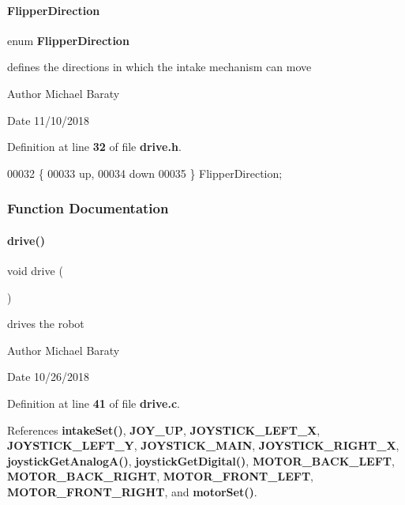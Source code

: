 \paragraph{Flipper\+Direction}
{\footnotesize\ttfamily enum \textbf{ Flipper\+Direction}}



defines the directions in which the intake mechanism can move 

\begin{DoxyAuthor}{Author}
Michael Baraty 
\end{DoxyAuthor}
\begin{DoxyDate}{Date}
11/10/2018 
\end{DoxyDate}


Definition at line \textbf{ 32} of file \textbf{ drive.\+h}.


\begin{DoxyCode}
00032              \{
00033   up,
00034   down
00035 \} FlipperDirection;
\end{DoxyCode}


\subsubsection{Function Documentation}
\mbox{\label{drive_8h_a928e32686c7e00c1ecde24c3da3019f7}} 
\paragraph{drive()}
{\footnotesize\ttfamily void drive (\begin{DoxyParamCaption}{ }\end{DoxyParamCaption})}



drives the robot 

\begin{DoxyAuthor}{Author}
Michael Baraty 
\end{DoxyAuthor}
\begin{DoxyDate}{Date}
10/26/2018 
\end{DoxyDate}


Definition at line \textbf{ 41} of file \textbf{ drive.\+c}.



References \textbf{ intake\+Set()}, \textbf{ J\+O\+Y\+\_\+\+UP}, \textbf{ J\+O\+Y\+S\+T\+I\+C\+K\+\_\+\+L\+E\+F\+T\+\_\+X}, \textbf{ J\+O\+Y\+S\+T\+I\+C\+K\+\_\+\+L\+E\+F\+T\+\_\+Y}, \textbf{ J\+O\+Y\+S\+T\+I\+C\+K\+\_\+\+M\+A\+IN}, \textbf{ J\+O\+Y\+S\+T\+I\+C\+K\+\_\+\+R\+I\+G\+H\+T\+\_\+X}, \textbf{ joystick\+Get\+Analog\+A()}, \textbf{ joystick\+Get\+Digital()}, \textbf{ M\+O\+T\+O\+R\+\_\+\+B\+A\+C\+K\+\_\+\+L\+E\+FT}, \textbf{ M\+O\+T\+O\+R\+\_\+\+B\+A\+C\+K\+\_\+\+R\+I\+G\+HT}, \textbf{ M\+O\+T\+O\+R\+\_\+\+F\+R\+O\+N\+T\+\_\+\+L\+E\+FT}, \textbf{ M\+O\+T\+O\+R\+\_\+\+F\+R\+O\+N\+T\+\_\+\+R\+I\+G\+HT}, and \textbf{ motor\+Set()}.



